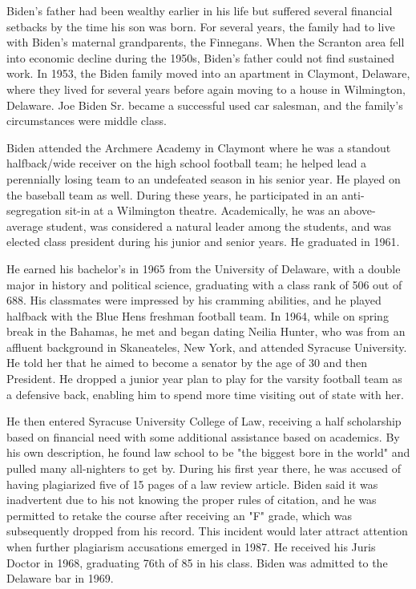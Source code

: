Biden's father had been wealthy earlier in his life but suffered several
financial setbacks by the time his son was born. For several years, the
family had to live with Biden's maternal grandparents, the Finnegans.
When the Scranton area fell into economic decline during the 1950s,
Biden's father could not find sustained work. In 1953, the Biden family
moved into an apartment in Claymont, Delaware, where they lived for
several years before again moving to a house in Wilmington, Delaware.
Joe Biden Sr. became a successful used car salesman, and the family's
circumstances were middle class.

Biden attended the Archmere Academy in Claymont where he was a standout
halfback/wide receiver on the high school football team; he helped lead
a perennially losing team to an undefeated season in his senior year. He
played on the baseball team as well. During these years, he participated
in an anti-segregation sit-in at a Wilmington theatre. Academically, he
was an above-average student, was considered a natural leader among the
students, and was elected class president during his junior and senior
years. He graduated in 1961.

He earned his bachelor's in 1965 from the University of Delaware, with a
double major in history and political science, graduating with a class
rank of 506 out of 688. His classmates were impressed by his cramming
abilities, and he played halfback with the Blue Hens freshman football
team. In 1964, while on spring break in the Bahamas, he met and began
dating Neilia Hunter, who was from an affluent background in
Skaneateles, New York, and attended Syracuse University. He told her
that he aimed to become a senator by the age of 30 and then President.
He dropped a junior year plan to play for the varsity football team as a
defensive back, enabling him to spend more time visiting out of state
with her.

He then entered Syracuse University College of Law, receiving a half
scholarship based on financial need with some additional assistance
based on academics. By his own description, he found law school to be
"the biggest bore in the world" and pulled many all-nighters to get by.
During his first year there, he was accused of having plagiarized five
of 15 pages of a law review article. Biden said it was inadvertent due
to his not knowing the proper rules of citation, and he was permitted to
retake the course after receiving an "F" grade, which was subsequently
dropped from his record. This incident would later attract attention
when further plagiarism accusations emerged in 1987. He received his
Juris Doctor in 1968, graduating 76th of 85 in his class. Biden was
admitted to the Delaware bar in 1969.

